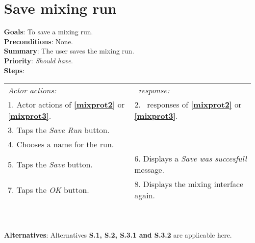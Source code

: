      \section{Save mixing run}
  \label{saverun}
  \textbf{Goals}: To save a mixing run.\\
  \textbf{Preconditions}: None. \\
  \textbf{Summary}: The user saves the mixing run.\\
  \textbf{Priority}: \emph{Should have}.\\
  \textbf{Steps}: \\
  \begin{tabular}{ p{} p{} }
  	\emph{Actor actions:} & \emph{\projectname\ response:} \\
  	1. Actor actions of \textbf{\ref{mixprot2}} or \textbf{\ref{mixprot3}}. & 2. \projectname\ responses of \textbf{\ref{mixprot2}} or \textbf{\ref{mixprot3}}. \\
    3. Taps the \emph{Save Run} button.  & \\
    4. Chooses a name for the run. & \\
    5. Taps the \emph{Save} button. & 6. Displays a \emph{Save was succesfull} message.\\
    7. Taps the \emph{OK} button. & 8. Displays the mixing interface again. \\
      \end{tabular}
    	 \\
    \\\textbf{Alternatives}: Alternatives \textbf{S.1, S.2, S.3.1 and S.3.2} are applicable here.

